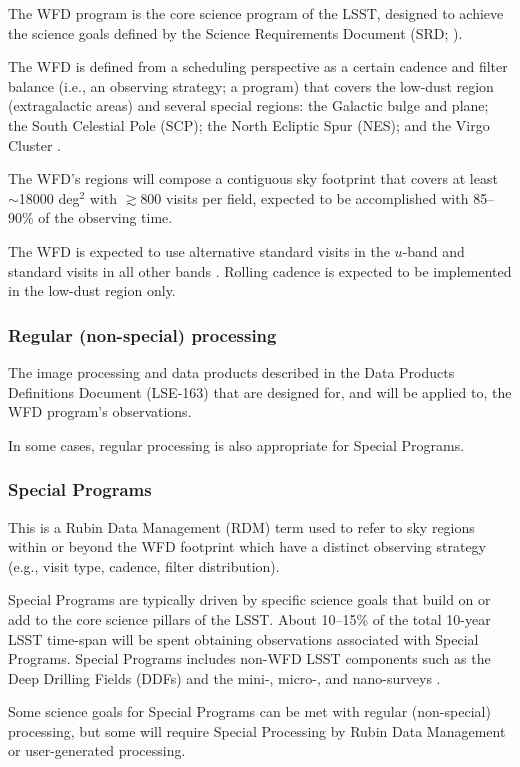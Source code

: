The WFD program is the core science program of the LSST, designed to achieve the science 
goals defined by the Science Requirements Document (SRD; ).

The WFD is defined from a scheduling perspective as a certain cadence and filter balance 
(i.e., an observing strategy; a program) 
that covers the low-dust region (extragalactic areas) and several special regions:
the Galactic bulge and plane; the South Celestial Pole (SCP); the North Ecliptic Spur (NES);
and the Virgo Cluster .

The WFD's regions will compose a contiguous sky footprint that covers at least $\sim$18000 deg$^2$ with 
$\gtrsim$800 visits per field, expected to be accomplished with 85--90\% 
of the observing time.

The WFD is expected to use alternative standard visits in the $u$-band and 
standard visits in all other bands .
Rolling cadence is expected to be implemented in the low-dust region only.

\subsubsection{Regular (non-special) processing}

The image processing and data products described in the Data Products Definitions Document
(LSE-163) that are designed for, and will be applied to, the WFD program's observations.

In some cases, regular processing is also appropriate for Special Programs.

\subsubsection{Special Programs} 

This is a Rubin Data Management (RDM) term used to refer to sky regions within
or beyond the WFD footprint which have a distinct observing strategy
(e.g., visit type, cadence, filter distribution).

Special Programs are typically driven by specific science goals that build on or 
add to the core science pillars of the LSST.
About 10--15\% of the total 10-year LSST time-span will be spent obtaining 
observations associated with Special Programs.
Special Programs includes non-WFD LSST components such as the Deep Drilling 
Fields (DDFs) and the mini-, micro-, and nano-surveys .

Some science goals for Special Programs can be met with regular (non-special) processing,
but some will require Special Processing by Rubin Data Management or user-generated processing.

